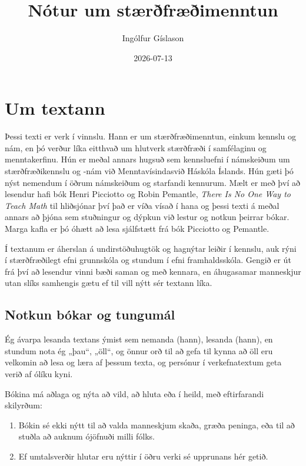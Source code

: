 \documentclass[
  icelandic,
]{book}
\title{Nótur um stærðfræðimenntun}
\author{Ingólfur Gíslason}
\date{2026-07-13}
\theoremstyle{definition}
\theoremstyle{definition}
\theoremstyle{definition}
\theoremstyle{definition}
\theoremstyle{remark}
\begin{document}
\maketitle

{
\setcounter{tocdepth}{1}
\tableofcontents
}
\chapter{Um textann}\label{umtextann}

Þessi texti er verk í vinnslu. Hann er um stærðfræðimenntun, einkum kennslu og nám, en þó verður líka eitthvað um hlutverk stærðfræði í samfélaginu og menntakerfinu. Hún er meðal annars hugsuð sem kennsluefni í námskeiðum um stærðfræðikennslu og -nám við Menntavísindasvið Háskóla Íslands. Hún gæti þó nýst nemendum í öðrum námskeiðum og starfandi kennurum. Mælt er með því að lesendur hafi bók Henri Picciotto og Robin Pemantle, \emph{There Is No One Way to Teach Math} \autocite{picciotto2025} til hliðsjónar því það er víða vísað í hana og þessi texti á meðal annars að þjóna sem stuðningur og dýpkun við lestur og notkun þeirrar bókar. Marga kafla er þó óhætt að lesa sjálfstætt frá bók Picciotto og Pemantle.

Í textanum er áherslan á undirstöðuhugtök og hagnýtar leiðir í kennslu, auk rýni í stærðfræðilegt efni grunnskóla og stundum í efni framhaldsskóla. Gengið er út frá því að lesendur vinni bæði saman og með kennara, en áhugasamar manneskjur utan slíks samhengis gætu ef til vill nýtt sér textann líka.

\section{Notkun bókar og tungumál}\label{notkun-tungumal}

Ég ávarpa lesanda textans ýmist sem nemanda (hann), lesanda (hann), en stundum nota ég „þau``, „öll``, og önnur orð til að gefa til kynna að öll eru velkomin að lesa og læra af þessum texta, og persónur í verkefnatextum geta verið af ólíku kyni.

Bókina má aðlaga og nýta að vild, að hluta eða í heild, með eftirfarandi skilyrðum:

\begin{enumerate}
\def\labelenumi{\arabic{enumi}.}
\item
  Bókin sé ekki nýtt til að valda manneskjum skaða, græða peninga, eða til að stuðla að auknum ójöfnuði milli fólks.
\item
  Ef umtalsverðir hlutar eru nýttir í öðru verki sé upprunans hér getið.
\end{enumerate}
\end{document}
